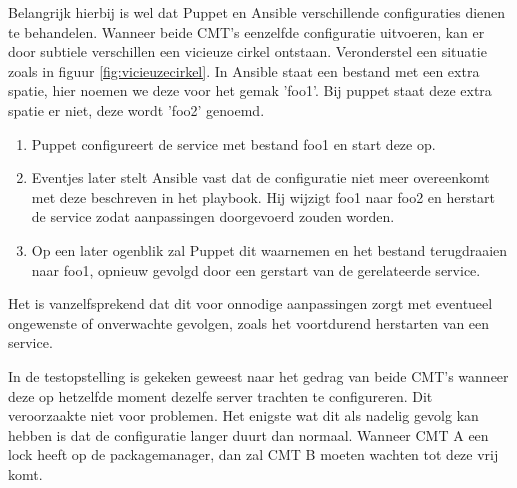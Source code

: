  Belangrijk hierbij is wel dat Puppet en Ansible verschillende configuraties dienen te behandelen. Wanneer beide \gls{CMT}'s eenzelfde configuratie uitvoeren, kan er door subtiele verschillen een vicieuze cirkel ontstaan.
Veronderstel een situatie zoals in figuur \ref{fig:vicieuzecirkel}. In Ansible staat een bestand met een extra spatie, hier noemen we deze voor het gemak 'foo1'. Bij puppet staat deze extra spatie er niet, deze wordt 'foo2' genoemd. 
\begin{enumerate}
\item Puppet configureert de service met bestand foo1 en start deze op.
\item  Eventjes later stelt Ansible vast dat de configuratie niet meer overeenkomt met deze beschreven in het playbook. Hij wijzigt foo1 naar foo2 en herstart de service zodat aanpassingen doorgevoerd zouden worden.
\item  Op een later ogenblik zal Puppet dit waarnemen en het bestand terugdraaien naar foo1, opnieuw gevolgd door een gerstart van de gerelateerde service.
\end{enumerate}
Het is vanzelfsprekend dat dit voor onnodige aanpassingen zorgt met eventueel ongewenste of onverwachte gevolgen, zoals het voortdurend herstarten van een service.

In de testopstelling is gekeken geweest naar het gedrag van beide \gls{CMT}'s wanneer deze op hetzelfde moment dezelfe server trachten te configureren. Dit veroorzaakte niet voor problemen.
Het enigste wat dit als nadelig gevolg kan hebben is dat de configuratie langer duurt dan normaal. Wanneer \gls{CMT} A een lock heeft op de \gls{packagemanager}, dan zal \gls{CMT} B moeten wachten tot deze vrij komt. 



